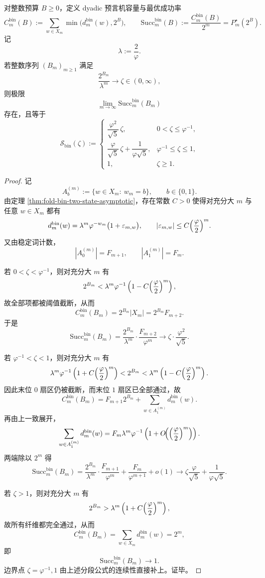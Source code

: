 \begin{theorem}\label{thm:xi-foldbin-dyadic-capacity-critical-window-limit}
对整数预算 \(B\ge 0\)，定义 dyadic 预言机容量与最优成功率
\[
C_m^{\mathrm{bin}}(B):=\sum_{w\in X_m}\min\!\bigl(d_m^{\mathrm{bin}}(w),2^B\bigr),
\qquad
\mathrm{Succ}_m^{\mathrm{bin}}(B):=\frac{C_m^{\mathrm{bin}}(B)}{2^m}=P_m^\star(2^B).
\]
记
\[
\lambda:=\frac{2}{\varphi}.
\]
若整数序列 \((B_m)_{m\ge 1}\) 满足
\[
\frac{2^{B_m}}{\lambda^m}\longrightarrow \zeta\in(0,\infty),
\]
则极限
\[
\lim_{m\to\infty}\mathrm{Succ}_m^{\mathrm{bin}}(B_m)
\]
存在，且等于
\[
\mathcal S_{\mathrm{bin}}(\zeta)
:=
\begin{cases}
\dfrac{\varphi^2}{\sqrt5}\,\zeta, & 0<\zeta\le \varphi^{-1},\\[3mm]
\dfrac{\varphi}{\sqrt5}\,\zeta+\dfrac{1}{\varphi\sqrt5}, & \varphi^{-1}\le \zeta\le 1,\\[3mm]
1, & \zeta\ge 1.
\end{cases}
\]
\end{theorem}
\begin{proof}
记
\[
A_b^{(m)}:=\{w\in X_m:\ w_m=b\},
\qquad
b\in\{0,1\}.
\]
由定理 \ref{thm:fold-bin-two-state-asymptotic}，存在常数 \(C>0\) 使得对充分大 \(m\) 与任意 \(w\in X_m\) 都有
\[
d_m^{\mathrm{bin}}(w)
=
\lambda^m\varphi^{-w_m}\bigl(1+\varepsilon_{m,w}\bigr),
\qquad
|\varepsilon_{m,w}|\le C\Bigl(\frac{\varphi}{2}\Bigr)^m.
\]
又由稳定词计数，
\[
|A_0^{(m)}|=F_{m+1},
\qquad
|A_1^{(m)}|=F_m.
\]

若 \(0<\zeta<\varphi^{-1}\)，则对充分大 \(m\) 有
\[
2^{B_m}<\lambda^m\varphi^{-1}\left(1-C\Bigl(\frac{\varphi}{2}\Bigr)^m\right),
\]
故全部项都被阈值截断，从而
\[
C_m^{\mathrm{bin}}(B_m)=2^{B_m}|X_m|=2^{B_m}F_{m+2}.
\]
于是
\[
\mathrm{Succ}_m^{\mathrm{bin}}(B_m)
=
\frac{2^{B_m}}{\lambda^m}\cdot \frac{F_{m+2}}{\varphi^m}
\longrightarrow
\zeta\cdot \frac{\varphi^2}{\sqrt5}.
\]

若 \(\varphi^{-1}<\zeta<1\)，则对充分大 \(m\) 有
\[
\lambda^m\varphi^{-1}\left(1+C\Bigl(\frac{\varphi}{2}\Bigr)^m\right)
<
2^{B_m}
<
\lambda^m\left(1-C\Bigl(\frac{\varphi}{2}\Bigr)^m\right).
\]
因此末位 \(0\) 扇区仍被截断，而末位 \(1\) 扇区已全部通过，故
\[
C_m^{\mathrm{bin}}(B_m)
=
F_{m+1}2^{B_m}+\sum_{w\in A_1^{(m)}}d_m^{\mathrm{bin}}(w).
\]
再由上一致展开，
\[
\sum_{w\in A_1^{(m)}}d_m^{\mathrm{bin}}(w)
=
F_m\lambda^m\varphi^{-1}\left(1+O\!\Bigl(\Bigl(\frac{\varphi}{2}\Bigr)^m\Bigr)\right).
\]
两端除以 \(2^m\) 得
\[
\mathrm{Succ}_m^{\mathrm{bin}}(B_m)
=
\frac{2^{B_m}}{\lambda^m}\cdot \frac{F_{m+1}}{\varphi^m}
+
\frac{F_m}{\varphi^{m+1}}
+
o(1)
\longrightarrow
\zeta\frac{\varphi}{\sqrt5}+\frac{1}{\varphi\sqrt5}.
\]

若 \(\zeta>1\)，则对充分大 \(m\) 有
\[
2^{B_m}>\lambda^m\left(1+C\Bigl(\frac{\varphi}{2}\Bigr)^m\right),
\]
故所有纤维都完全通过，从而
\[
C_m^{\mathrm{bin}}(B_m)=\sum_{w\in X_m}d_m^{\mathrm{bin}}(w)=2^m,
\]
即
\[
\mathrm{Succ}_m^{\mathrm{bin}}(B_m)\to 1.
\]
边界点 \(\zeta=\varphi^{-1},1\) 由上述分段公式的连续性直接补上。证毕。
\end{proof}

